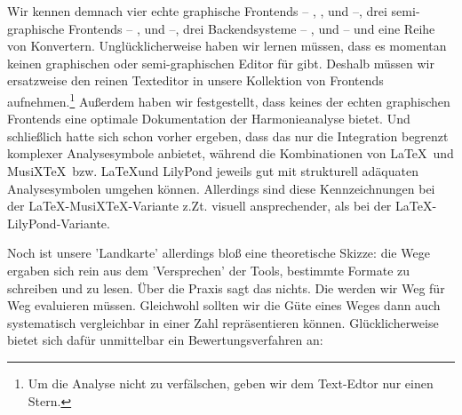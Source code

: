 Wir kennen demnach vier echte graphische Frontends -- ,
,  und  --, drei semi-graphische
Frontends -- ,  und  --,  drei
Backendsysteme -- ,  und
 -- und eine Reihe von Konvertern. Unglücklicherweise
haben wir lernen müssen, dass es momentan keinen graphischen oder
semi-graphischen Editor für  gibt. Deshalb müssen wir ersatzweise
den reinen Texteditor in unsere Kollektion von Frontends aufnehmen.\footnote{Um
die Analyse nicht zu verfälschen, geben wir dem Text-Edtor nur einen Stern.}
Außerdem haben wir festgestellt, dass keines der echten graphischen Frontends
eine optimale Dokumentation der Harmonieanalyse bietet.
Und schließlich hatte sich schon vorher ergeben, dass das
 nur die Integration begrenzt komplexer Analysesymbole
anbietet, während die Kombinationen von \LaTeX\ und MusiX\TeX\ bzw. \LaTeX und
LilyPond jeweils gut mit strukturell adäquaten Analysesymbolen umgehen können.
Allerdings sind diese Kennzeichnungen bei der \LaTeX-MusiX\TeX-Variante z.Zt.
visuell ansprechender, als bei der \LaTeX-LilyPond-Variante.

Noch ist unsere 'Landkarte' allerdings bloß eine theoretische Skizze: die Wege
ergaben sich rein aus dem 'Versprechen' der Tools, bestimmte Formate zu
schreiben und zu lesen. Über die Praxis sagt das nichts. Die werden wir Weg für
Weg evaluieren müssen. Gleichwohl sollten wir die Güte eines Weges dann auch
systematisch vergleichbar in einer Zahl repräsentieren können. Glücklicherweise
bietet sich dafür unmittelbar ein Bewertungsverfahren an:

